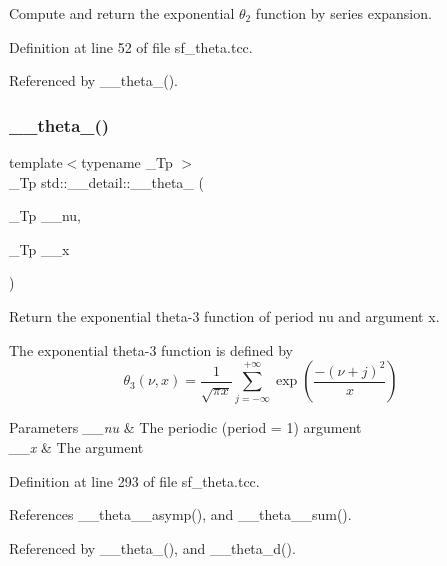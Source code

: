 Compute and return the exponential $ \theta_2 $ function by series expansion. 

Definition at line 52 of file sf\+\_\+theta.\+tcc.



Referenced by \+\_\+\+\_\+theta\+\_().

\mbox{\label{namespacestd_1_1____detail_a6f965c639307555e5979b954a11ca0b8}} 
\subsubsection{\texorpdfstring{\+\_\+\+\_\+theta\+\_()}{\_\_theta\_3()}}
{\footnotesize\ttfamily template$<$typename \+\_\+\+Tp $>$ \\
\+\_\+\+Tp std\+::\+\_\+\+\_\+detail\+::\+\_\+\+\_\+theta\+\_ (\begin{DoxyParamCaption}\item[{\+\_\+\+Tp}]{\+\_\+\+\_\+nu,  }\item[{\+\_\+\+Tp}]{\+\_\+\+\_\+x }\end{DoxyParamCaption})}

Return the exponential theta-\/3 function of period {\ttfamily nu} and argument {\ttfamily x}.

The exponential theta-\/3 function is defined by \[ \theta_3(\nu,x) = \frac{1}{\sqrt{\pi x}} \sum_{j=-\infty}^{+\infty} \exp\left( \frac{-(\nu+j)^2}{x} \right) \]


\begin{DoxyParams}{Parameters}
{\em \+\_\+\+\_\+nu} & The periodic (period = 1) argument \\
\hline
{\em \+\_\+\+\_\+x} & The argument \\
\hline
\end{DoxyParams}


Definition at line 293 of file sf\+\_\+theta.\+tcc.



References \+\_\+\+\_\+theta\+\_\+\_\+asymp(), and \+\_\+\+\_\+theta\+\_\+\_\+sum().



Referenced by \+\_\+\+\_\+theta\+\_(), and \+\_\+\+\_\+theta\+\_\+d().

\mbox{\label{namespacestd_1_1____detail_a975a9a52a8a483849dd0877c24ca5d74}} 
